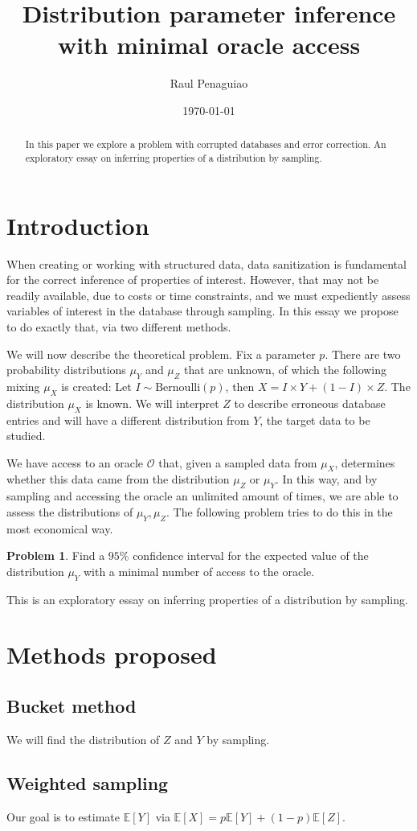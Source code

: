 \documentclass[a4paper]{amsart}
\title{Distribution parameter inference with minimal oracle access}
\date{\today}
\author{Raul Penaguiao}
\newcommand{\E}{\mathbb{E}}
\theoremstyle{definition}
\newtheorem{problem}[lemma]{Problem}
\theoremstyle{remark}
\newtheorem{to do}[lemma]{To Do}
\theoremstyle{remark}
\begin{document}
\begin{abstract}
In this paper we explore a problem with corrupted databases and error correction.
An exploratory essay on inferring properties of a distribution by sampling.
\end{abstract}

\maketitle




\section{Introduction}

When creating or working with structured data, data sanitization is fundamental for the correct inference of properties of interest.
However, that may not be readily available, due to costs or time constraints, and we must expediently assess variables of interest in the database through sampling.
In this essay we propose to do exactly that, via two different methods.

We will now describe the theoretical problem.
Fix a parameter $p$.
There are two probability distributions $\mu_Y$ and $\mu_Z$ that are unknown, of which the following mixing $\mu_X$ is created:
Let $I \sim \mathrm{Bernoulli}(p)$, then $X = I \times Y + (1 - I) \times Z$.
The distribution $\mu_X$ is known.
We will interpret $Z$ to describe erroneous database entries and will have a different distribution from $Y$, the target data to be studied.

We have access to an oracle $\mathcal O$ that, given a sampled data from $\mu_X$, determines whether this data came from the distribution $\mu_Z$ or $\mu_Y$.
In this way, and by sampling and accessing the oracle an unlimited amount of times, we are able to assess the distributions of $\mu_Y, \mu_Z$.
The following problem tries to do this in the most economical way.


\begin{problem}
Find a $95 \%$ confidence interval for the expected value of the distribution $\mu_Y$ with a minimal number of access to the oracle.
\end{problem}


This is an exploratory essay on inferring properties of a distribution by sampling.


\section{Methods proposed}


\subsection{Bucket method}

We will find the distribution of $Z$ and $Y$ by sampling.

\subsection{Weighted sampling}


Our goal is to estimate $\E [ Y ]$ via $\E [ X ] = p \E[Y] + (1-p) \E[Z]$.



\end{document}

